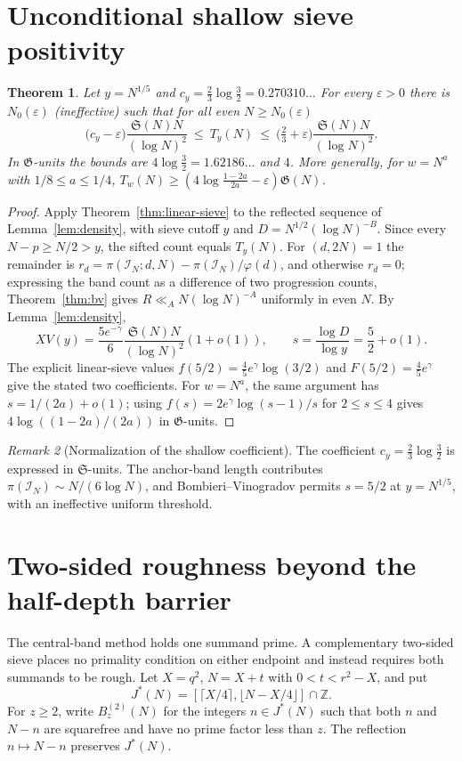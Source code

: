 \documentclass[final,11pt]{elsarticle}
\newtheorem{theorem}{Theorem}[section]
\theoremstyle{definition}
\theoremstyle{remark}
\newtheorem{remark}[theorem]{Remark}
\newcommand{\Sg}{\mathfrak{S}}
\newcommand{\GG}{\mathfrak{G}}
\newcommand{\eps}{\varepsilon}
\newcommand{\band}{\mathcal{I}_N}
\numberwithin{equation}{section}
\begin{document}
\section{Unconditional shallow sieve positivity}\label{sec:block3}


\begin{theorem}\label{thm:shallow}
Let $y=N^{1/5}$ and $c_y=\tfrac23\log\tfrac32=0.270310\ldots$ For every $\eps>0$ there is $N_0(\eps)$ (ineffective) such that for all even $N\ge N_0(\eps)$
\[
\bigl(c_y-\eps\bigr)\frac{\Sg(N)N}{(\log N)^2}\ \le\ T_y(N)\ \le\ \bigl(\tfrac23+\eps\bigr)\frac{\Sg(N)N}{(\log N)^2}.
\]
In $\GG$-units the bounds are $4\log\tfrac32=1.62186\ldots$ and $4$. More generally, for $w=N^a$ with $1/8\le a\le1/4$, $T_w(N)\ge(4\log\frac{1-2a}{2a}-\eps)\GG(N)$.
\end{theorem}

\begin{proof}
Apply Theorem~\ref{thm:linear-sieve} to the reflected sequence
of Lemma~\ref{lem:density}, with sieve cutoff $y$ and
$D=N^{1/2}(\log N)^{-B}$. Since every $N-p\ge N/2>y$,
the sifted count equals $T_y(N)$. For $(d,2N)=1$ the remainder
is $r_d=\pi(\band;d,N)-\pi(\band)/\varphi(d)$, and otherwise
$r_d=0$; expressing the band count as a difference of two
progression counts, Theorem~\ref{thm:bv} gives
$R\ll_A N(\log N)^{-A}$ uniformly in even $N$.
By Lemma~\ref{lem:density},
\[
XV(y)=\frac{5e^{-\gamma}}6\frac{\Sg(N)N}{(\log N)^2}(1+o(1)),
\qquad s=\frac{\log D}{\log y}=\frac52+o(1).
\]
The explicit linear-sieve values
$f(5/2)=\frac45e^\gamma\log(3/2)$ and
$F(5/2)=\frac45e^\gamma$ give the stated two coefficients.
For $w=N^a$, the same argument has $s=1/(2a)+o(1)$;
using $f(s)=2e^\gamma\log(s-1)/s$ for $2\le s\le4$
gives $4\log((1-2a)/(2a))$ in $\GG$-units.
\end{proof}

\begin{remark}[Normalization of the shallow coefficient]\label{rem:shallow-normalization}
The coefficient $c_y=\frac23\log\frac32$ is expressed in $\Sg$-units. The anchor-band length contributes $\pi(\band)\sim N/(6\log N)$, and Bombieri--Vinogradov permits $s=5/2$ at $y=N^{1/5}$, with an ineffective uniform threshold.
\end{remark}

\section{Two-sided roughness beyond the half-depth barrier}\label{sec:two-sided}
The central-band method holds one summand prime. A complementary two-sided sieve places no primality condition on either endpoint and instead requires both summands to be rough. Let $X=q^2$, $N=X+t$ with $0<t<r^2-X$, and put
\[
 J^*(N)=[\lceil X/4\rceil,\lfloor N-X/4\rfloor]\cap\mathbb Z.
\]
For $z\ge2$, write $B_z^{(2)}(N)$ for the integers $n\in J^*(N)$ such that both $n$ and $N-n$ are squarefree and have no prime factor less than $z$. The reflection $n\mapsto N-n$ preserves $J^*(N)$.
\end{document}
